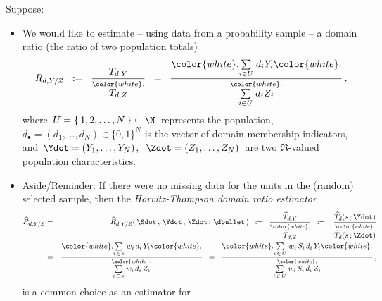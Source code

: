 Suppose:
\begin{itemize}
\item
    We would like to estimate
    -- using data from a probability sample --
    a domain ratio (the ratio of two population totals)
    \begin{equation*}
    R_{d,Y/Z}
    \;\; := \;\;
        \dfrac{T_{d,Y}}{\overset{{\color{white}.}}{T_{d,Z}}}
    \;\; = \;\;
        \dfrac{
            {\color{white}.}
            \underset{i \in U}{\sum}\;d_{i}Y_{i}
            {\color{white}.}
            }{
            \overset{{\color{white}.}}{\underset{i \in U}{\sum}\;d_{i}Z_{i}}
            }\,,
    \end{equation*}
    where \,$U = \{\,1,2,\ldots,N\,\} \subset \N$\, represents the population,
    $d_{\bullet} = (d_{1},\ldots,d_{N}) \in \{0,1\}^{N}$ is the vector of domain membership indicators,
    and
    \,$\Ydot = (Y_{1},\ldots,Y_{N})$,\,
    \,$\Zdot = (Z_{1},\ldots,Z_{N})$\,
    are two $\Re$-valued population characteristics.
\item
    Aside/Reminder:
    If there were no missing data for the units in the (random) selected sample,
    then the \textit{Horvitz-Thompson domain ratio estimator}
    \begin{eqnarray*}
    \widehat{R}_{d,Y/Z}
    & = &
        \widehat{R}_{d,Y/Z}(\,
            \Sdot\,,\,
            \Ydot\,,\,
            \Zdot\,;\,
            \dbullet
            \,)
    \;\; := \;\;
        \dfrac{
            \widehat{T}_{d,Y}
            }{
            \overset{{\color{white}.}}{
                \widehat{T}_{d,Z}
                }
            }
    \;\; :=: \;\;
        \dfrac{
            \widehat{T}_{d}(s\,;\Ydot)
            }{
            \overset{{\color{white}.}}{
                \widehat{T}_{d}(s\,;\Zdot)
                }
            }
    \\
    & = &
        \dfrac{
            {\color{white}.}
            \underset{i\,\in\,s}{\sum}\;w_{i}\,d_{i}\,Y_{i}
            {\color{white}.}
            }{
            \overset{{\color{white}.}}{
                \underset{i\,\in\,s}{\sum}\;w_{i}\,d_{i}\,Z_{i}
                }
            }
    \;\; = \;\;
        \dfrac{
            {\color{white}.}
            \underset{i\,\in\,U}{\sum}\;w_{i}\,S_{i}\,d_{i}\,Y_{i}
            {\color{white}.}
            }{
            \overset{{\color{white}.}}{
                \underset{i\,\in\,U}{\sum}\;w_{i}\,S_{i}\,d_{i}\,Z_{i}
                }
            }\,,
    \end{eqnarray*}
    is a common choice as an estimator for

\end{itemize}

